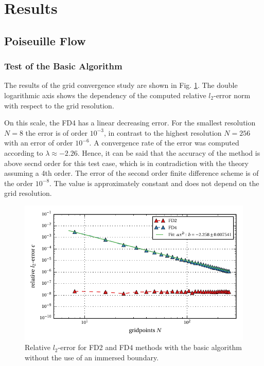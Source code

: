 \section{Results}
\subsection{Poiseuille Flow}
\subsubsection{Test of the Basic Algorithm}

The results of the grid convergence study are shown in Fig. \ref{fig:ema1}.
The double logarithmic axis shows the dependency of the computed relative $l_2$-error norm
with respect to the grid resolution.

On this scale, the FD4 has a linear decreasing error.
For the smallest resolution $N=8$ the error is of order $10^{-3}$,
in contrast to the highest resolution $N=256$ with an error of order $10^{-6}$.
A convergence rate of the error  was computed  according to $\lambda\approx -2.26$.
Hence, it can be said that the accuracy of the method is above secnd order for this test case,
which is in contradiction with the theory assuming a 4th order.
The error of the second order finite difference scheme is of the order $10^{-8}$.
The value is approximately constant and does not depend on the grid resolution.

\begin{figure}[!bp]
    \centering
    \includegraphics{gfx/immersed_boundary/poiseuille_flow/1_default/relative_l2error.pdf}
    \caption{Relative $l_2$-error for FD2 and FD4 methods with the basic algorithm without the use of an immersed boundary.\label{fig:ema1}}
\end{figure}


